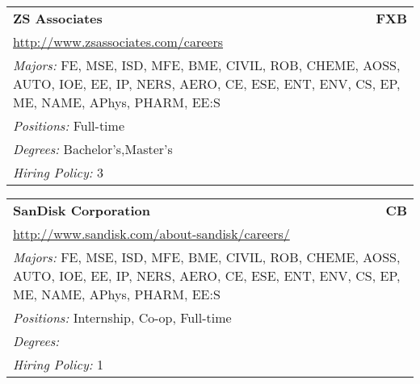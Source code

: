 \documentclass[twoside]{article}
\begin{document}
\begin{center}
\begin{multicols}{3}
\begin{FlushLeft}
\begin{minipage}{\columnwidth}\begin{tabularx}{.95\columnwidth}{Xr}
                 {\Large\bf ZS Associates} & {\Large\bf FXB}\\
    \multicolumn{2}{p{.95\columnwidth}}{\url{http://www.zsassociates.com/careers}}\\
    \multicolumn{2}{p{.95\columnwidth}}{\emph{Majors:} FE, MSE, ISD, MFE, BME, CIVIL, ROB, CHEME, AOSS, AUTO, IOE, EE, IP, NERS, AERO, CE, ESE, ENT, ENV, CS, EP, ME, NAME, APhys, PHARM, EE:S}\\
    \multicolumn{2}{p{.95\columnwidth}}{\emph{Positions:} Full-time}\\
    \multicolumn{2}{p{.95\columnwidth}}{\emph{Degrees:} Bachelor's,Master's}\\
    \multicolumn{2}{p{.95\columnwidth}}{\emph{Hiring Policy:} 3}\\
    \end{tabularx}
    
\end{minipage}
 
\begin{minipage}{\columnwidth}\begin{tabularx}{.95\columnwidth}{Xr}
                 {\Large\bf SanDisk Corporation} & {\Large\bf CB}\\
    \multicolumn{2}{p{.95\columnwidth}}{\url{http://www.sandisk.com/about-sandisk/careers/}}\\
    \multicolumn{2}{p{.95\columnwidth}}{\emph{Majors:} FE, MSE, ISD, MFE, BME, CIVIL, ROB, CHEME, AOSS, AUTO, IOE, EE, IP, NERS, AERO, CE, ESE, ENT, ENV, CS, EP, ME, NAME, APhys, PHARM, EE:S}\\
    \multicolumn{2}{p{.95\columnwidth}}{\emph{Positions:} Internship, Co-op, Full-time}\\
    \multicolumn{2}{p{.95\columnwidth}}{\emph{Degrees:} }\\
    \multicolumn{2}{p{.95\columnwidth}}{\emph{Hiring Policy:} 1}\\
    \end{tabularx}
    
\end{minipage}
 
\end{FlushLeft}
    \end{multicols}\end{center}
    \newpage{}
\end{document}
